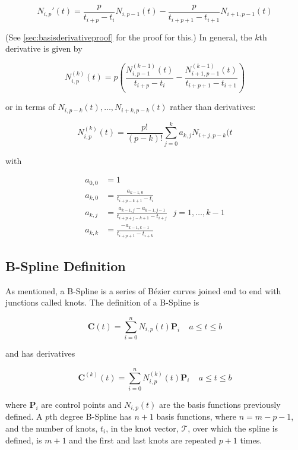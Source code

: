 \begin{equation}
\label{eqn:basisderivative}
N_{i,p}'(t) = \frac{p}{t_{i+p} - t_i} N_{i,p-1}(t) - \frac{p}{t_{i+p+1} - t_{i+1}} N_{i+1,p-1}(t)
\end{equation}

(See \cref{sec:basisderivativeproof} for the proof for this.) In general, the $k$th derivative is given by

\begin{equation}
\label{eqn:basisder1}
	N_{i,p}^{(k)}(t) = p \left( \frac{N_{i,p-1}^{(k-1)}(t)}{t_{i+p} - t_i} - \frac{N_{i+1,p-1}^{(k-1)}(t)}{t_{i+p+1} - t_{i+1}} \right)
\end{equation}

or in terms of $N_{i,p-k}(t), \ldots, N_{i+k,p-k}(t)$ rather than derivatives:

\begin{equation}
\label{eqn:basisder2}
	N_{i,p}^{(k)}(t) = \frac{p!}{(p-k)!} \sum^k_{j=0} a_{k,j} N_{i+j,p-k}(t
\end{equation}

with

\begin{align}
a_{0,0} &= 1\\
a_{k,0} &= \frac{a_{k-1,0}}{t_{i+p-k+1} - t_i}\\
a_{k,j} &= \frac{a_{k-1,j} - a_{k-1,j-1}}{t_{i+p+j-k+1} - t_{i+j} } ~~~ j=1,\ldots,k-1\\
a_{k,k} &= \frac{-a_{k-1,k-1}}{t_{i+p+1} - t_{i+k} }
\end{align}


\subsection{B-Spline Definition}
As mentioned, a B-Spline is a series of Bézier curves joined end to end with junctions called knots.  The definition of a B-Spline is

\begin{equation} \textbf{C}(t) = \sum^n_{i=0}N_{i,p}(t) \textbf{P}_i~~~~~a\leq t \leq b \end{equation}

and has derivatives

\begin{equation} \textbf{C}^{(k)}(t) = \sum^n_{i=0}N^{(k)}_{i,p}(t) \textbf{P}_i~~~~~a\leq t \leq b \end{equation}

where $\textbf{P}_i$ are control points and $N_{i,p}(t) $ are the basis functions previously defined. A $p$th degree B-Spline has $n+1$ basis functions, where $n = m-p-1$, and the number of knots, $t_i$, in the knot vector, $\mathcal{T}$, over which the spline is defined, is $m+1$ and the first and last knots are repeated $p+1$ times.
 
